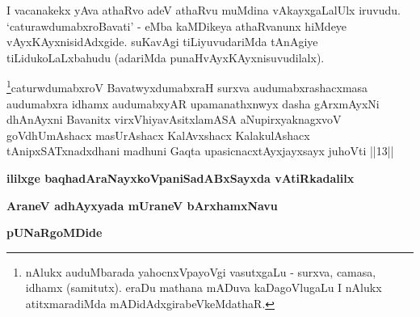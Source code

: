 \begin{artha}
I vacanakekx yAva athaRvo adeV athaRvu muMdina vAkayxgaLalUlx iruvudu. 
`caturawdumabxroBavati' - eMba kaMDikeya athaRvanunx hiMdeye 
vAyxKAyxnisidAdxgide. suKavAgi tiLiyuvudariMda tAnAgiye 
tiLidukoLaLxbahudu (adariMda punaH\break vAyxKAyxnisuvudilalx).
\end{artha}

\begin{kandikeshl}
\footnote{nAlukx auduMbarada yahocnxVpayoVgi vasutxgaLu - surxva, camasa, idhamx (samitutx). eraDu mathana mADuva kaDagoVlugaLu I nAlukx atitxmaradiMda mADidAdxgirabeVkeMdathaR.}caturwdumabxroV BavatwyxdumabxraH surxva audumabxrashacxmasa audumabxra idhamx audumabxyAR upamanathxnwyx dasha gArxmAyxNi dhAnAyxni Bavanitx virxVhiyavAsitxlamASA aNupirxyaknagxvoV goVdhUmAshacx masUrAshacx KalAvxshacx KalakulAshacx tAnipxSATxnadxdhani madhuni Gaqta upasicnacxtAyxjayxsayx juhoVti ||13||
\end{kandikeshl}


\begin{center}
{\bf ililxge baqhadAraNayxkoVpaniSadABxSayxda vAtiRkadalilx}

\smallskip
{\bf AraneV adhAyxyada mUraneV bArxhamxNavu}

\smallskip
{\bf pUNaRgoMDide}
\end{center}
